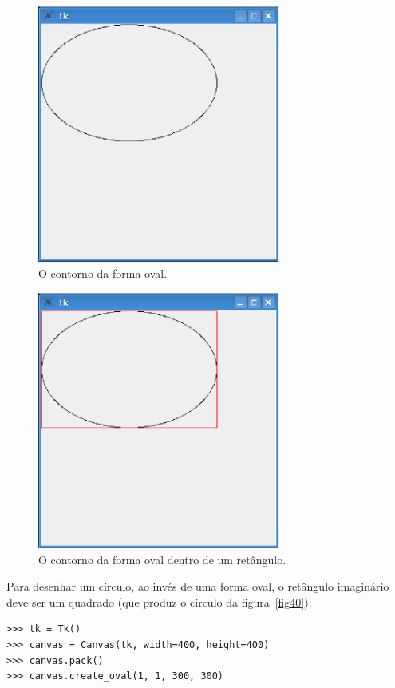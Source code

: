 \begin{figure}
\begin{center}
\includegraphics[width=80mm]{eps/figure38.eps}
\end{center}
\caption{O contorno da forma oval.}\label{fig38}
\end{figure}

\begin{figure}
\begin{center}
\includegraphics[width=80mm]{eps/figure39.eps}
\end{center}
\caption{O contorno da forma oval dentro de um retângulo.}\label{fig39}
\end{figure}

\noindent
Para desenhar um círculo, ao invés de uma forma oval, o retângulo imaginário deve ser um quadrado (que produz o círculo da figura~\ref{fig40}):

\begin{listing}
\begin{verbatim}
>>> tk = Tk()
>>> canvas = Canvas(tk, width=400, height=400)
>>> canvas.pack()
>>> canvas.create_oval(1, 1, 300, 300)
\end{verbatim}
\end{listing}


